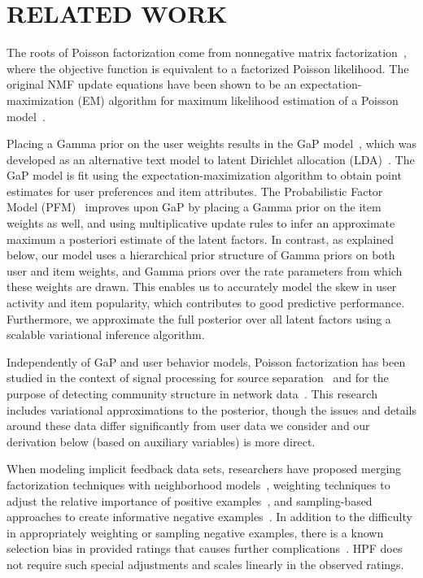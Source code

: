 \section{RELATED WORK}
\label{sec:related}
The roots of Poisson factorization come from nonnegative matrix
factorization~\cite{Lee:1999}, where the objective function is
equivalent to a factorized Poisson likelihood.  The original NMF
update equations have been shown to be an expectation-maximization
(EM) algorithm for maximum likelihood estimation of a Poisson
model~\cite{Cemgil:2009}.

Placing a Gamma prior on the user weights results in the GaP
model~\cite{Canny:2004}, which was developed as an alternative text
model to latent Dirichlet allocation
(LDA)~\cite{Blei:2003b,Inouye:2014}. The GaP model is fit using the
expectation-maximization algorithm to obtain point estimates for user
preferences and item attributes. The Probabilistic Factor Model
(PFM)~\cite{Ma:2011} improves upon GaP by placing a Gamma prior on the
item weights as well, and using multiplicative update rules to infer
an approximate maximum a posteriori estimate of the latent factors.
In contrast, as explained below, our model uses a hierarchical prior
structure of Gamma priors on both user and item weights, and Gamma
priors over the rate parameters from which these weights are
drawn. This enables us to accurately model the skew in user activity
and item popularity, which contributes to good predictive
performance. Furthermore, we approximate the full posterior over all
latent factors using a scalable variational inference algorithm.

Independently of GaP and user behavior models, Poisson factorization
has been studied in the context of signal processing for source
separation~\cite{Cemgil:2009,Hoffman:2012} and for the purpose of
detecting community structure in network
data~\cite{Ball:2011,Gopalan:2013}. This research includes variational
approximations to the posterior, though the issues and details around
these data differ significantly from user data we consider and our
derivation below (based on auxiliary variables) is more direct.

When modeling implicit feedback data sets, researchers have proposed
merging factorization techniques with neighborhood
models~\cite{Koren:2008}, weighting techniques to adjust the relative
importance of positive examples~\cite{Hu:2008p9402}, and
sampling-based approaches to create informative negative
examples~\cite{Gantner:2012p9364,Dror:2012a,Paquet:2013p9197}.  In
addition to the difficulty in appropriately weighting or sampling
negative examples, there is a known selection bias in provided ratings
that causes further complications~\cite{Marlin:2012}.  HPF
does not require such special adjustments and scales linearly in the
observed ratings.

